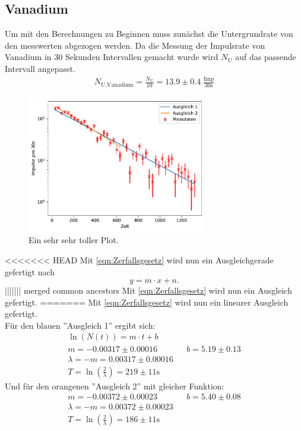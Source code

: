 \subsection{Vanadium}
Um mit den Berechnungen zu Beginnen muss zunächst die Untergrundrate von den messwerten abgezogen werden.
Da die Messung der Impulsrate von Vanadium in 30 Sekunden Intervallen gemacht wurde wird $N_{\text{U}}$ auf das passende Intervall angepasst.
\begin{align*}
    N_{\text{U},\text{Vanadium}} =  \frac{N_{\text{U}}}{10} = 13.9 \pm 0.4 \; \frac{\text{Imp}}{30\text{s}}
\end{align*}
\begin{figure}
    \centering
    \includegraphics[width=0.7\textwidth]{plots/Vanadium.pdf}
    \caption{Ein sehr sehr toller Plot.}
\end{figure}
<<<<<<< HEAD
Mit \ref{eqn:Zerfallsgesetz} wird nun ein Ausgleichgerade gefertigt nach
\begin{equation*}
    y=m\cdot x+n.
\end{equation*}
||||||| merged common ancestors
Mit \ref{eqn:Zerfallsgesetz} wird nun ein Ausgleich gefertigt.
=======
Mit \ref{eqn:Zerfallsgesetz} wird nun ein linearer Ausgleich gefertigt. \\
Für den blauen ''Ausgleich 1'' ergibt sich:
\begin{align*}
    \ln(N(t)) = m \cdot t + b\\
     m = -0.00317 \pm 0.00016 && b = 5.19 \pm 0.13 \\
    \lambda = -m = 0.00317 \pm 0.00016 \\
    T = \ln\left( \frac{2}{\lambda} \right) = 219 \pm 11 \text{s}
\end{align*}
Und für den orangenen ''Ausgleich 2'' mit gleicher Funktion:
\begin{align*}
     m = -0.00372 \pm 0.00023 && b = 5.40 \pm 0.08 \\
    \lambda = -m = 0.00372 \pm 0.00023 \\
    T = \ln\left( \frac{2}{\lambda} \right) = 186 \pm 11 \text{s}
\end{align*}

